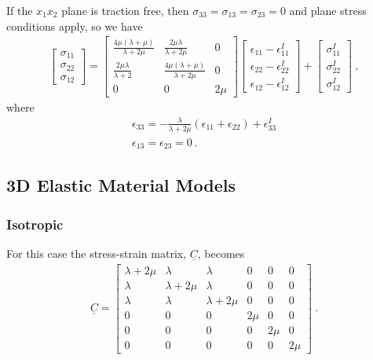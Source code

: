If the $x_{1}x_{2}$ plane is traction free, then $\sigma_{33}=\sigma_{13}=\sigma_{23}=0$
and plane stress conditions apply, so we have
\begin{gather}
\left[\begin{array}{c}
\sigma_{11}\\
\sigma_{22}\\
\sigma_{12}
\end{array}\right]=\left[\begin{array}{ccc}
\frac{4\mu(\lambda+\mu)}{\lambda+2\mu} & \frac{2\mu\lambda}{\lambda+2\mu} & 0\\
\frac{2\mu\lambda}{\lambda+2} & \frac{4\mu(\lambda+\mu)}{\lambda+2\mu} & 0\\
0 & 0 & 2\mu
\end{array}\right]\left[\begin{array}{c}
\epsilon_{11}-\epsilon_{11}^{I}\\
\epsilon_{22}-\epsilon_{22}^{I}\\
\epsilon_{12}-\epsilon_{12}^{I}
\end{array}\right]+\left[\begin{array}{c}
\sigma_{11}^{I}\\
\sigma_{22}^{I}\\
\sigma_{12}^{I}
\end{array}\right]\:,\label{eq:11}
\end{gather}
where
\begin{equation}
\begin{gathered}\epsilon_{33}=-\frac{\lambda}{\lambda+2\mu}(\epsilon_{11}+\epsilon_{22})+\epsilon_{33}^{I}\\
\epsilon_{13}=\epsilon_{23}=0\,.
\end{gathered}
\label{eq:12}
\end{equation}

\subsection{3D Elastic Material Models}

\subsubsection{Isotropic}

For this case the stress-strain matrix, $\underline{C}$, becomes
\begin{gather}
\underline{C}=\left[\begin{array}{cccccc}
\lambda+2\mu & \lambda & \lambda & 0 & 0 & 0\\
\lambda & \lambda+2\mu & \lambda & 0 & 0 & 0\\
\lambda & \lambda & \lambda+2\mu & 0 & 0 & 0\\
0 & 0 & 0 & 2\mu & 0 & 0\\
0 & 0 & 0 & 0 & 2\mu & 0\\
0 & 0 & 0 & 0 & 0 & 2\mu
\end{array}\right]\:.\label{eq:13}
\end{gather}



